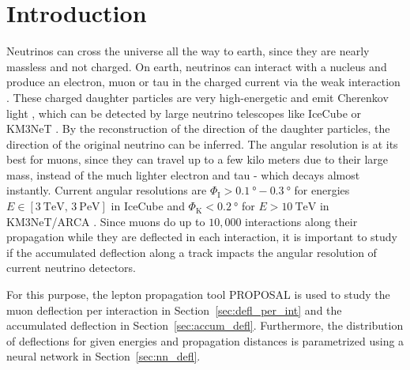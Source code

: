 \section{Introduction}\label{sec:introduction}
Neutrinos can cross the universe all the way to earth, since they are 
nearly massless and not charged. On earth, neutrinos can interact 
with a nucleus and produce an electron, muon or tau in the charged current 
via the weak interaction \cite{}. These charged daughter particles are very 
high-energetic and emit Cherenkov light \cite{}, which can be detected 
by large neutrino telescopes like IceCube \cite{IceCube_Instrumentation} or 
KM3NeT \cite{KM3NeT_Design}. 
By the reconstruction of the direction of the daughter particles, the direction 
of the original neutrino can be inferred. The angular resolution is at its 
best for muons, since they can travel up to a few kilo meters due to their 
large mass, instead of the much lighter electron and tau - which decays almost 
instantly. Current angular resolutions are 
$\Phi_{\text{I}} > \SI{0.1}{\degree} - \SI{0.3}{\degree}$ for energies 
$E \in [\SI{3}{\tera\electronvolt},\,\SI{3}{\peta\electronvolt}]$ in IceCube 
\cite{IceCube_Resolution2021} 
and 
$\Phi_{\text{K}} < \SI{0.2}{\degree}$ for $E > \SI{10}{\tera\electronvolt}$ in 
KM3NeT/ARCA \cite{KM3NeT_Resolution2021}.
Since muons do up to $10,000$ interactions along their propagation while they 
are deflected in each interaction, it is important to study if the accumulated 
deflection along a track impacts the angular resolution of current 
neutrino detectors. 

For this purpose, the lepton propagation 
tool PROPOSAL \cite{koehne2013proposal, dunsch_2018_proposal_improvements} is used to study the muon deflection per interaction in 
Section~\ref{sec:defl_per_int} and the 
accumulated deflection in Section~\ref{sec:accum_defl}. Furthermore, 
the distribution of deflections for given energies and propagation distances 
is parametrized using a neural network in Section~\ref{sec:nn_defl}.




